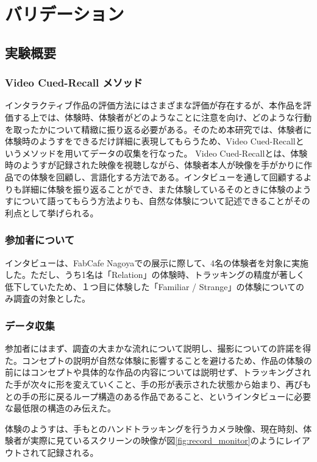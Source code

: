 \chapter{バリデーション}
\section{実験概要}
\subsection{Video Cued-Recall メソッド}
インタラクティブ作品の評価方法にはさまざまな評価が存在するが、本作品を評価する上では、体験時、体験者がどのようなことに注意を向け、どのような行動を取ったかについて精緻に振り返る必要がある。そのため本研究では、体験者に体験時のようすをできるだけ詳細に表現してもらうため、Video Cued-Recallというメソッドを用いてデータの収集を行なった。 Video Cued-Recallとは、体験時のようすが記録された映像を視聴しながら、体験者本人が映像を手がかりに作品での体験を回顧し、言語化する方法である\cite{Costello2005}。インタビューを通して回顧するよりも詳細に体験を振り返ることができ、また体験しているそのときに体験のようすについて語ってもらう方法よりも、自然な体験について記述できることがその利点として挙げられる。

\subsection{参加者について}
インタビューは、FabCafe Nagoyaでの展示に際して、4名の体験者を対象に実施した。ただし、うち1名は「Relation」の体験時、トラッキングの精度が著しく低下していたため、１つ目に体験した「Familiar / Strange」の体験についてのみ調査の対象とした。

\subsection{データ収集}
参加者にはまず、調査の大まかな流れについて説明し、撮影についての許諾を得た。コンセプトの説明が自然な体験に影響することを避けるため、作品の体験の前にはコンセプトや具体的な作品の内容については説明せず、トラッキングされた手が次々に形を変えていくこと、手の形が表示された状態から始まり、再びもとの手の形に戻るループ構造のある作品であること、というインタビューに必要な最低限の構造のみ伝えた。

体験のようすは、手もとのハンドトラッキングを行うカメラ映像、現在時刻、体験者が実際に見ているスクリーンの映像が図\ref{fig:record_monitor}のようにレイアウトされて記録される。

